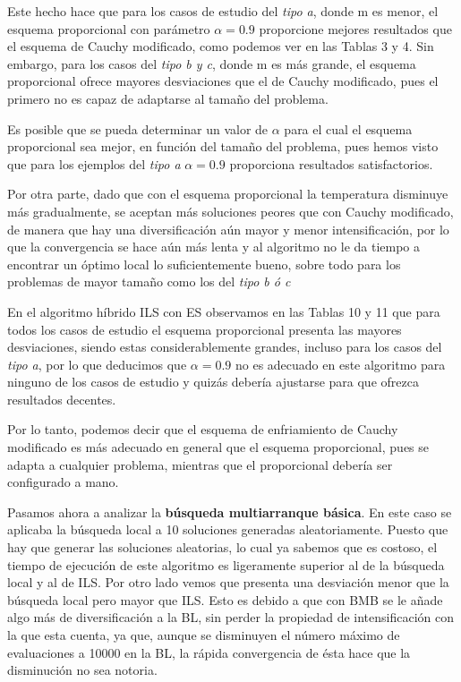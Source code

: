 \documentclass[11pt,a4paper]{article}
\begin{document}
	Este hecho hace que para los casos de estudio del \textit{tipo a}, donde m es menor, el esquema proporcional con parámetro $\alpha=0.9$ proporcione mejores resultados que el esquema de Cauchy modificado, como podemos ver en las Tablas 3 y 4. Sin embargo, para los casos del \textit{tipo b y c}, donde m es más grande, el esquema proporcional ofrece mayores desviaciones que el de Cauchy modificado, pues el primero no es capaz de adaptarse al tamaño del problema. 
	
	Es posible que se pueda determinar un valor de $\alpha$ para el cual el esquema proporcional sea mejor, en función del tamaño del problema, pues hemos visto que para los ejemplos del \textit{tipo a} $\alpha=0.9$ proporciona resultados satisfactorios. 
	
	Por otra parte, dado que con el esquema proporcional la temperatura disminuye más gradualmente, se aceptan más soluciones peores que con Cauchy modificado, de manera que hay una diversificación aún mayor y menor intensificación, por lo que la convergencia se hace aún más lenta y al algoritmo no le da tiempo a encontrar un óptimo local lo suficientemente bueno, sobre todo para los problemas de mayor tamaño como los del \textit{tipo b ó c}
		
	En el algoritmo híbrido ILS con ES observamos en las Tablas 10 y 11 que para todos los casos de estudio el esquema proporcional presenta las mayores desviaciones, siendo estas considerablemente grandes, incluso para los casos del \textit{tipo a}, por lo que deducimos que $\alpha=0.9$ no es adecuado en este algoritmo para ninguno de los casos de estudio y quizás debería ajustarse para que ofrezca resultados decentes. 
	
	Por lo tanto, podemos decir que el esquema de enfriamiento de Cauchy modificado es más adecuado en general que el esquema proporcional, pues se adapta a cualquier problema, mientras que el proporcional debería ser configurado a mano. 
	
	Pasamos ahora a analizar la \textbf{búsqueda multiarranque básica}. En este caso se aplicaba la búsqueda local a 10 soluciones generadas aleatoriamente. Puesto que hay que generar las soluciones aleatorias, lo cual ya sabemos que es costoso, el tiempo de ejecución de este algoritmo es ligeramente superior al de la búsqueda local y al de ILS. Por otro lado vemos que presenta una desviación menor que la búsqueda local pero mayor que ILS. Esto es debido a que con BMB se le añade algo más de diversificación a la BL, sin perder la propiedad de intensificación con la que esta cuenta, ya que, aunque se disminuyen el número máximo de evaluaciones a 10000 en la BL, la rápida convergencia de ésta hace que la disminución no sea notoria. 
	
\end{document}
